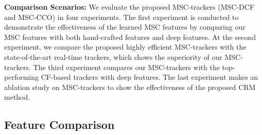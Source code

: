 \documentclass[runningheads]{llncs}
\begin{document}
\noindent \textbf{Comparison Scenarios:} We evaluate the proposed MSC-trackers (MSC-DCF and MSC-CCO) in four experiments. The first experiment is conducted to demonstrate the effectiveness of the learned MSC features by comparing our MSC features with both hand-crafted features and deep features.  At the second experiment, we compare the proposed highly efficient MSC-trackers with the state-of-the-art real-time trackers, which shows the superiority of our MSC-trackers. The third experiment compares our MSC-trackers with the top-performing CF-based trackers with deep features. The last experiment makes an ablation study on MSC-trackers to show the effectiveness of the proposed CRM method.




\subsection{Feature Comparison}
\end{document}
